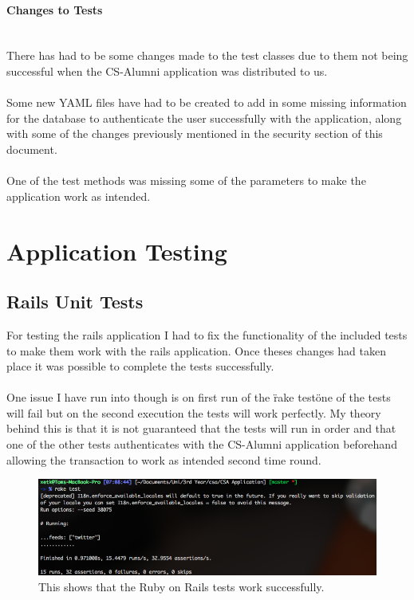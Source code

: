 \documentclass{article}
\newcommand{\myparagraph}[1]{\paragraph{#1}\mbox{}\\}
\begin{document}
\myparagraph{Changes to Tests}

There has had to be some changes made to the test classes due to them not being successful when the CS-Alumni application was distributed to us.\\
\\
Some new YAML files have had to be created to add in some missing information for the database to authenticate the user successfully with the application, along with some of the changes previously mentioned in the security section of this document.\\
\\
One of the test methods was missing some of the parameters to make the application work as intended.

\newpage
\section{Application Testing}

\subsection{Rails Unit Tests}

For testing the rails application I had to fix the functionality of the included tests to make them work with the rails application. Once theses changes had taken place it was possible to complete the tests successfully.\\
\\
One issue I have run into though is on first run of the \"rake test\"  one of the tests will fail but on the second execution the tests will work perfectly. My theory behind this is that it is not guaranteed that the tests will run in order and that one of the other tests authenticates with the CS-Alumni application beforehand allowing the transaction to work as intended second time round.

\begin{figure}[H]
\centering
\includegraphics[width=\textwidth]{railstests}
\caption{This shows that the Ruby on Rails tests work successfully.}
\end{figure}
\end{document}
